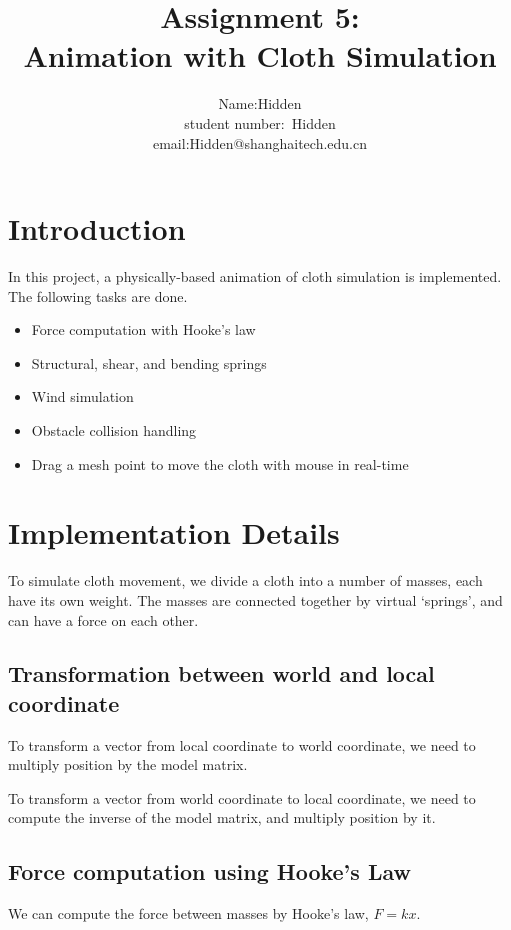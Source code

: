 \documentclass[acmtog]{acmart}
\title{Assignment 5:\\ {Animation with Cloth Simulation}}
\author{Name:\quad Hidden  \\ student number:\ Hidden
\\email:\quad Hidden@shanghaitech.edu.cn}
\begin{document}
\maketitle

\vspace*{2 ex}

\section{Introduction}

In this project, a physically-based animation of cloth simulation is implemented. The following tasks are done.

\begin{itemize}
\item Force computation with Hooke's law
\item Structural, shear, and bending springs
\item Wind simulation
\item Obstacle collision handling
\item Drag a mesh point to move the cloth with mouse in real-time
\end{itemize}
\section{Implementation Details}

To simulate cloth movement, we divide a cloth into a number of masses, each have its own weight. The masses are connected together by virtual `springs', and can have a force on each other. 

\subsection{Transformation between world and local coordinate}

To transform a vector from local coordinate to world coordinate, we need to multiply position by the model matrix.

To transform a vector from world coordinate to local coordinate, we need to compute the inverse of the model matrix, and multiply position by it.

\subsection{Force computation using Hooke's Law}

We can compute the force between masses by Hooke's law, $F=kx$. 
\end{document}
